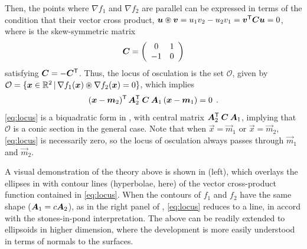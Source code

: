 Then, the points where $\nabla f_1$ and $\nabla f_2$ are parallel can be expressed in terms of the
condition that their vector cross product,
$\bm{u} \circledast \bm{v} = u_1 v_2 - u_2 v_1 = \bm{v}^\mathsf{T} \bm{C} \bm{u} = 0$, where  is the skew-symmetric matrix
\begin{equation*}
\bm{C} = \left(
\begin{array}{cc}
 0 & 1 \\ -1 & 0
\end{array}
\right)
\end{equation*}
satisfying $\bm{C} = -\bm{C}^\mathsf{T}$.
Thus, the locus of osculation is the set $\mathcal{O}$, given by $\mathcal{O}  = \{\bm{x} \in \mathbb{R}^{2} \, | \, \nabla f_1(\bm{x}) \circledast \nabla f_2(\bm{x}) = 0 \}$,
which implies
\begin{equation}
(\bm{x}-\bm{m}_2)^\mathsf{T} \, \bm{A}_2 ^\mathsf{T} \: \bm{C} \: \bm{A}_1 \, (\bm{x}-\bm{m}_1) = 0  \:\: .  \label{eq:locus}
\end{equation}
\eqref{eq:locus} is a biquadratic form in , with central matrix $\bm{A}_2 ^\mathsf{T} \: \bm{C} \: \bm{A}_1$,
implying that $\mathcal{O}$ is a conic section in the general case. Note that when $\vec{x}=\vec{m}_1$ or $\vec{x}=\vec{m}_2$,
\eqref{eq:locus} is necessarily zero, so the locus of osculation always passes through  $\vec{m}_1$ and $\vec{m}_2$.

A visual demonstration of the theory above is
shown in  (left), which overlays the ellipses in  with contour lines
(hyperbolae, here)
of
the vector cross-product function contained in \eqref{eq:locus}.
When the contours of $f_1$ and $f_2$ have the same shape ($\bm{A}_1 = c \bm{A}_2 $), as in the right panel of ,
\eqref{eq:locus}
reduces to a line, in accord with the stones-in-pond interpretation.
The above can be readily extended to ellipsoids in higher dimension, where the development is more easily understood
in terms of normals to the surfaces.

